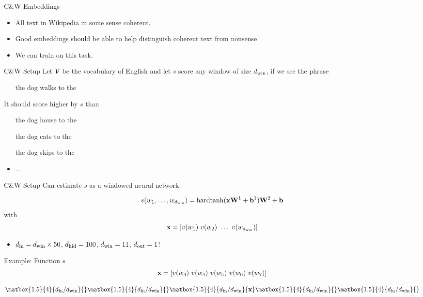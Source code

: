 \documentclass{beamer}
\begin{document}
\begin{frame}{C\&W Embeddings}
  \begin{itemize}
  \item All text in Wikipedia in some sense coherent.
    \air
  \item Good embeddings should be able to help distinguish coherent text from nonsense
    \air

  \item We can train on this task.
  \end{itemize}
\end{frame}


\begin{frame}{C\&W Setup}
  Let $\mathcal{V}$ be the vocabulary of English and let $s$
  score any window of size ${d_{\mathrm{win}}}$, if we see the phrase

  \begin{itemize}
  \item [ the dog walks to the ]
  \end{itemize}

  It should score higher by $s$ than

  \begin{itemize}
  \item [ the dog \alert{house} to the ]
  \item [ the dog \alert{cats} to the ]
  \item [ the dog \alert{skips} to the ]
  \item ...
  \end{itemize}
\end{frame}

\begin{frame}{C\&W Setup}
  Can estimate $s$ as a windowed neural network.

  \[ s(w_1, \ldots, w_{{d_{\mathrm{win}}}}) = \mathrm{hardtanh}(\mathbf{x} \mathbf{W}^1 + \mathbf{b}^1) \mathbf{W}^2 + \mathbf{b} \]
  with
  \[ \mathbf{x} = [v(w_1)\  v(w_2) \  \ldots \  v(w_{{d_{\mathrm{win}}}})]  \]

  \begin{itemize}
  \item ${d_{\mathrm{in}}} = {d_{\mathrm{win}}} \times 50$, ${d_{\mathrm{hid}}} = 100$, ${d_{\mathrm{win}}}=11$, \alert{${d_{\mathrm{out}}} = 1$}!
  \end{itemize}

  Example: Function $s$
  \[ \boldx = [v(w_3)\  v(w_4) \  v(w_5) \ v(w_6) \ v(w_7)]  \]

  \[\renewcommand\matscale{.6}
  \matbox{1.5}{4}{\din /\dwin}{} \matbox{1.5}{4}{\din /\dwin}{} \matbox{1.5}{4}{\din /\dwin}{\boldx} \matbox{1.5}{4}{\din /\dwin}{} \matbox{1.5}{4}{\din /\dwin}{}\]
\end{frame}
\end{document}
